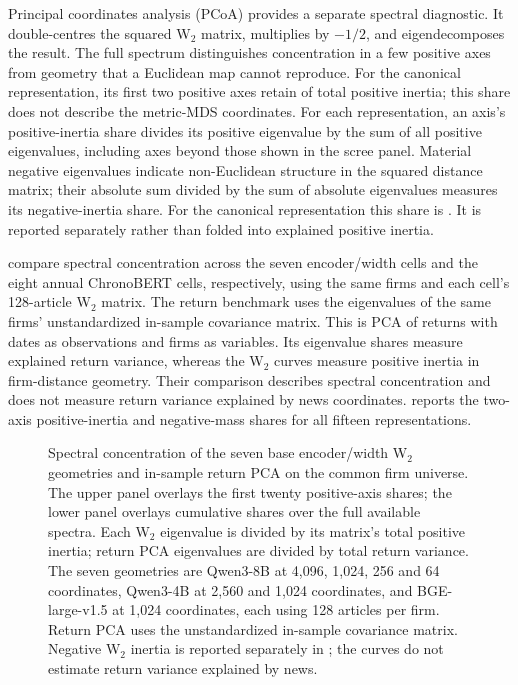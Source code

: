 Principal coordinates analysis (PCoA) provides a separate spectral diagnostic.
It double-centres the squared W$_2$ matrix, multiplies by $-1/2$, and
eigendecomposes the result.
The full spectrum distinguishes concentration in a few positive axes from
geometry that a Euclidean map cannot reproduce.
For the canonical representation, its first two positive axes retain
 of total positive inertia; this share does not
describe the metric-MDS coordinates.
For each representation, an axis's positive-inertia share divides its positive
eigenvalue by the sum of all positive eigenvalues, including axes beyond those
shown in the scree panel.
Material negative eigenvalues indicate non-Euclidean structure in the squared
distance matrix; their absolute sum divided by the sum of absolute eigenvalues
measures its negative-inertia share.
For the canonical representation this share is
.
It is reported separately rather than folded into explained positive inertia.

 compare spectral concentration
across the seven encoder/width cells and the eight annual ChronoBERT cells,
respectively, using the same firms and each cell's 128-article W$_2$ matrix.
The return benchmark uses the eigenvalues of the same firms' unstandardized
in-sample covariance matrix.
This is PCA of returns with dates as observations and firms as variables.
Its eigenvalue shares measure explained return variance, whereas the W$_2$
curves measure positive inertia in firm-distance geometry.
Their comparison describes spectral concentration and does not measure return
variance explained by news coordinates.
 reports the two-axis positive-inertia and negative-mass
shares for all fifteen representations.

\begin{figure}[H]
  \centering
  \caption{Spectral concentration of the seven base encoder/width W$_2$
    geometries and in-sample return PCA on the common firm universe.
    The upper panel overlays the first twenty positive-axis shares; the lower
    panel overlays cumulative shares over the full available spectra.
    Each W$_2$ eigenvalue is divided by its matrix's total positive inertia;
    return PCA eigenvalues are divided by total return variance.
    The seven geometries are Qwen3-8B at 4,096, 1,024, 256 and 64 coordinates,
    Qwen3-4B at 2,560 and 1,024 coordinates, and BGE-large-v1.5 at 1,024
    coordinates, each using 128 articles per firm.
    Return PCA uses the unstandardized in-sample covariance matrix.
    Negative W$_2$ inertia is reported separately in
    ; the curves do not estimate return variance
  explained by news. }
  \label{fig:pcoa-scree}
\end{figure}


